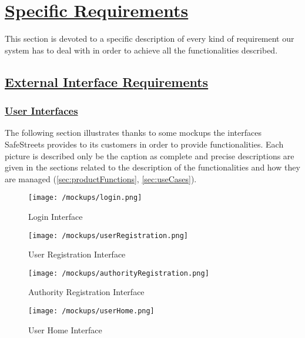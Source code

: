 \section[Specific Requirements]{\hyperlink{toc}{Specific Requirements}}
	\label{sec:specificRequirements}
	This section is devoted to a specific description of every kind of requirement our system has to deal with in order to achieve all the functionalities described.

\subsection[External Interface Requirements]{\hyperlink{toc}{External Interface Requirements}}
	\label{sec:externalInterfaceRequirements}
	\subsubsection[User Interfaces]{\hyperlink{toc}{User Interfaces}} %
	\label{sec:userInterfaces}
	The following section illustrates thanks to some mockups the interfaces SafeStreets provides to its customers in order to provide functionalities. Each picture is described only be the caption as complete and precise descriptions are given in the sections related to the description of the functionalities and how they are managed (\ref{sec:productFunctions}, \ref{sec:useCases}).
	
	\begin{figure}[h]
		\centering
		\begin{minipage}{0.45\textwidth}
			\centering
			\texttt{[image: /mockups/login.png]}
			\caption{Login Interface}
		\end{minipage}\hfill
		\begin{minipage}{0.45\textwidth}
			\centering
			\texttt{[image: /mockups/userRegistration.png]}
			\caption{User Registration Interface}
		\end{minipage}
	\end{figure}

	\begin{figure}[h]
		\centering
		\begin{minipage}{0.45\textwidth}
			\centering
			\texttt{[image: /mockups/authorityRegistration.png]}
			\caption{Authority Registration Interface}
		\end{minipage}\hfill
		\begin{minipage}{0.45\textwidth}
			\centering
			\texttt{[image: /mockups/userHome.png]}
			\caption{User Home Interface}
		\end{minipage}
	\end{figure}

